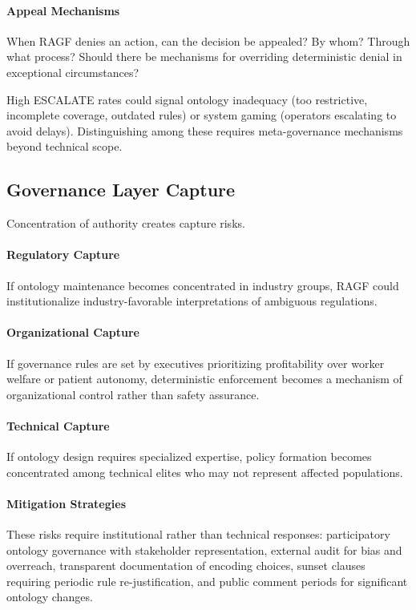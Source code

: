 \documentclass[sigconf,nonacm]{acmart}
\begin{document}
\paragraph{Appeal Mechanisms} When RAGF denies an action, can the decision be appealed? By whom? Through what process? Should there be mechanisms for overriding deterministic denial in exceptional circumstances?

High ESCALATE rates could signal ontology inadequacy (too restrictive, incomplete coverage, outdated rules) or system gaming (operators escalating to avoid delays). Distinguishing among these requires meta-governance mechanisms beyond technical scope.

\subsection{Governance Layer Capture}

Concentration of authority creates capture risks.

\paragraph{Regulatory Capture} If ontology maintenance becomes concentrated in industry groups, RAGF could institutionalize industry-favorable interpretations of ambiguous regulations.

\paragraph{Organizational Capture} If governance rules are set by executives prioritizing profitability over worker welfare or patient autonomy, deterministic enforcement becomes a mechanism of organizational control rather than safety assurance.

\paragraph{Technical Capture} If ontology design requires specialized expertise, policy formation becomes concentrated among technical elites who may not represent affected populations.

\paragraph{Mitigation Strategies} These risks require institutional rather than technical responses: participatory ontology governance with stakeholder representation, external audit for bias and overreach, transparent documentation of encoding choices, sunset clauses requiring periodic rule re-justification, and public comment periods for significant ontology changes.
\end{document}

